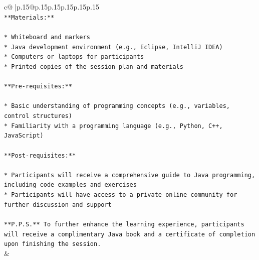\documentclass{article}
\begin{document}
{\begin{supertabular}{c@{$\;$}|p{.15\linewidth}@{}p{.15\linewidth}p{.15\linewidth}p{.15\linewidth}p{.15\linewidth}p{.15\linewidth}}
{{{\\ 
\texttt{**Materials:**} \\
\\ 
\texttt{* Whiteboard and markers} \\
\texttt{* Java development environment (e.g., Eclipse, IntelliJ IDEA)} \\
\texttt{* Computers or laptops for participants} \\
\texttt{* Printed copies of the session plan and materials} \\
\\ 
\texttt{**Pre{-}requisites:**} \\
\\ 
\texttt{* Basic understanding of programming concepts (e.g., variables, control structures)} \\
\texttt{* Familiarity with a programming language (e.g., Python, C++, JavaScript)} \\
\\ 
\texttt{**Post{-}requisites:**} \\
\\ 
\texttt{* Participants will receive a comprehensive guide to Java programming, including code examples and exercises} \\
\texttt{* Participants will have access to a private online community for further discussion and support} \\
\\ 
\texttt{**P.P.S.** To further enhance the learning experience, participants will receive a complimentary Java book and a certificate of completion upon finishing the session.} \\
            }
        }
    }
    & \\ \\


\end{supertabular}}
\end{document}
